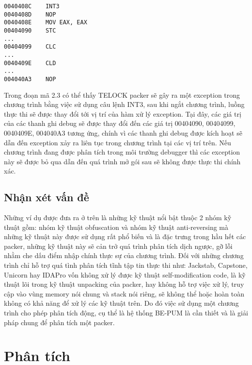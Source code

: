 \begin{code}
\begin{lstlisting}[captionpos=b,caption={Kỹ thuật Hardware Breakpoints sử dụng trong packer TELOCK},frame=single]
0040408C 	INT3
0040408D 	NOP
0040408E 	MOV EAX, EAX 
00404090 	STC
...
00404099 	CLC
...
0040409E 	CLD
...
004040A3 	NOP
\end{lstlisting}
\end{code} 

\hspace{0.5cm}Trong đoạn mã 2.3 có thể thấy TELOCK packer sẽ gây ra một exception trong chương trình bằng việc sử dụng câu lệnh INT3, sau khi ngắt chương trình, luồng thực thi sẽ được thay đổi tới vị trí của hàm xử lý exception. Tại đây, các giá trị của các thanh ghi debug sẽ được thay đổi đến các giá trị 00404090, 00404099, 0040409E, 004040A3 tương ứng, chính vì các thanh ghi debug được kích hoạt sẽ dẫn đến exception xảy ra liên tục trong chương trình tại các vị trí trên. Nếu chương trình đang được phân tích trong môi trường debugger thì các exception này sẽ được bỏ qua dẫn đến quá trình mở gói sau sẽ không được thực thi chính xác.   

\subsection{Nhận xét vấn đề}

\hspace{0.5cm}Những ví dụ được đưa ra ở trên là những kỹ thuật nổi bật thuộc 2 nhóm kỹ thuật gồm: nhóm kỹ thuật obfuscation và nhóm kỹ thuật anti-reversing mà những kỹ thuật này được sử dụng rất phổ biến và là đặc trưng trong hầu hết các packer, những kỹ thuật này sẽ cản trở quá trình phân tích dịch ngược, gỡ lỗi nhằm che dấu điểm nhập chính thực sự của chương trình. Đối với những chương trình chỉ hỗ trợ quá tình phân tích tĩnh tập tin thực thi như: Jackstab, Capstone, Unicorn hay IDAPro vốn không xử lý được kỹ thuật self-modification code, là kỹ thuật lõi trong kỹ thuật unpacking của packer, hay không hỗ trợ việc xử lý, truy cập vào vùng memory nói chung và stack nói riêng, sẽ không thể hoặc hoàn toàn không có khả năng để xử lý các kỹ thuật trên. Do đó việc sử dụng một chương trình cho phép phân tích động, cụ thể là hệ thống BE-PUM là cần thiết và là giải pháp chung để phân tích một packer.

\section{Phân tích}


